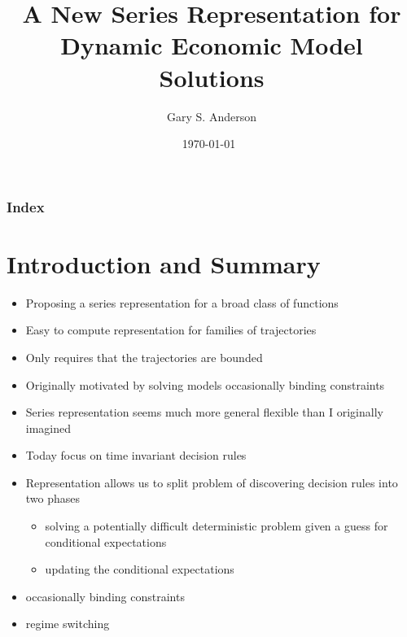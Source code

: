 \documentclass[tikz]{beamer}
\begin{document}
\title[A Series Representation  for Solving  Models]{A New Series Representation for Dynamic Economic Model Solutions }


\author{Gary S. Anderson}
\date{\today\ } 


\frame{\titlepage}

\begin{frame}[allowframebreaks]
\frametitle{Index}
\tableofcontents
\end{frame}


\section{Introduction and Summary}

\begin{frame}

 \begin{itemize}
 \item Proposing a series representation for a broad class of functions
 \item Easy to compute representation for 
families of trajectories
\item Only requires that the trajectories are bounded
\item Originally motivated by solving models occasionally binding constraints
\item Series representation seems much more general flexible than I originally imagined
\end{itemize}
\end{frame}


\begin{frame}
     \begin{itemize}
   \item Today focus on time invariant decision rules 
   \item Representation allows us to split problem of discovering decision rules into two phases
     \begin{itemize}
     \item solving a potentially difficult deterministic problem given a guess for conditional expectations
     \item updating the conditional expectations
   \end{itemize}
     \item occasionally binding constraints
     \item regime switching
\end{itemize}

\end{frame}
\end{document}
